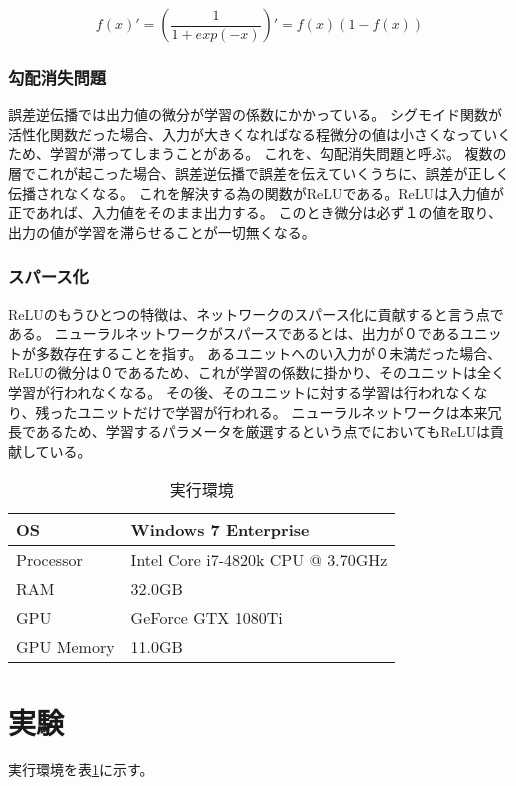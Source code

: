 \documentclass[twocolumn,fleqn]{jsarticle}
\begin{document}
\begin{equation}
    f(x)' = \left(\frac {1}{1 + exp(-x)}\right)' = f(x)(1 - f(x))
    \label{eq:diff_sigmoid}
\end{equation}

\subsubsection{勾配消失問題}
誤差逆伝播では出力値の微分が学習の係数にかかっている。
シグモイド関数が活性化関数だった場合、入力が大きくなればなる程微分の値は小さくなっていくため、学習が滞ってしまうことがある。
これを、勾配消失問題と呼ぶ。
複数の層でこれが起こった場合、誤差逆伝播で誤差を伝えていくうちに、誤差が正しく伝播されなくなる。
これを解決する為の関数がReLUである。ReLUは入力値が正であれば、入力値をそのまま出力する。
このとき微分は必ず１の値を取り、出力の値が学習を滞らせることが一切無くなる。

\subsubsection{スパース化}
ReLUのもうひとつの特徴は、ネットワークのスパース化に貢献すると言う点である。
ニューラルネットワークがスパースであるとは、出力が０であるユニットが多数存在することを指す。
あるユニットへのい入力が０未満だった場合、ReLUの微分は０であるため、これが学習の係数に掛かり、そのユニットは全く学習が行われなくなる。
その後、そのユニットに対する学習は行われなくなり、残ったユニットだけで学習が行われる。
ニューラルネットワークは本来冗長であるため、学習するパラメータを厳選するという点でにおいてもReLUは貢献している。

\begin{table}[tb]
    \caption{実行環境}
    \begin{tabular}{|l|l|} \hline
        OS & Windows 7 Enterprise \\ \hline
        Processor & Intel Core i7-4820k CPU @ 3.70GHz \\ \hline
        RAM & 32.0GB \\ \hline
        GPU & GeForce GTX 1080Ti\\ \hline
        GPU Memory & 11.0GB \\ \hline
    \end{tabular}
    \label{tab:div_env}
\end{table}
\section{実験}
実行環境を表\ref{tab:div_env}に示す。
\end{document}
